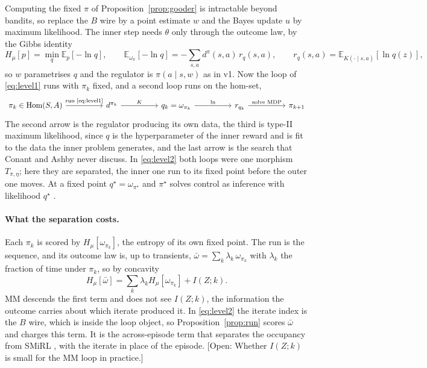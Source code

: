 \documentclass[10pt]{article}
\theoremstyle{plain}
\newcommand{\Hmu}[1]{H_\mu\!\left[#1\right]}
\newcommand{\occ}{d^{\pi}}
\newcommand{\E}{\mathbb E}
\newcommand{\Hom}{\operatorname{Hom}}
\newcommand{\open}[1]{\textcolor{red!70!black}{[Open: #1]}}
\begin{document}
Computing the fixed $\pi$ of Proposition~\ref{prop:gooder} is intractable beyond bandits, so replace the $B$ wire by a point estimate $w$ and the Bayes update $u$ by maximum likelihood.
The inner step needs $\theta$ only through the outcome law, by the Gibbs identity
\begin{equation}
  \Hmu{p} = \min_q \E_{p}[-\ln q],
  \qquad
  \E_{\omega_\pi}[-\ln q] = -\sum_{s,a} \occ(s,a)\, r_q(s,a),
  \qquad
  r_q(s,a) = \E_{K(\cdot \mid s,a)}[\ln q(z)],
  \label{eq:gibbs}
\end{equation}
so $w$ parametrises $q$ and the regulator is $\pi(a \mid s,w)$ as in v1.
Now the loop of \eqref{eq:level1} runs with $\pi_k$ fixed, and a second loop runs on the hom-set,
\begin{equation}
\begin{tikzcd}[column sep=huge]
\pi_k \in \Hom(S,A) \arrow[r, "\text{run \eqref{eq:level1}}"] & d^{\pi_k} \arrow[r, "K"] & q_k = \omega_{\pi_k} \arrow[r, "\ln"] & r_{q_k} \arrow[r, "\text{solve MDP}"] & \pi_{k+1}
\end{tikzcd}
\label{eq:mm}
\end{equation}
The second arrow is the regulator producing its own data, the third is type-II maximum likelihood, since $q$ is the hyperparameter of the inner reward and is fit to the data the inner problem generates, and the last arrow is the search that Conant and Ashby never discuss.
In \eqref{eq:level2} both loops were one morphism $T_{\pi,\eta}$; here they are separated, the inner one run to its fixed point before the outer one moves.
At a fixed point $q^\star = \omega_{\pi^\star}$ and $\pi^\star$ solves control as inference with likelihood $q^\star$ \citep{Toussaint-probabilistic06,Levine-reinforcement18}.

\paragraph{What the separation costs.}
Each $\pi_k$ is scored by $\Hmu{\omega_{\pi_k}}$, the entropy of its own fixed point.
The run is the sequence, and its outcome law is, up to transients, $\bar\omega = \sum_k \lambda_k\, \omega_{\pi_k}$ with $\lambda_k$ the fraction of time under $\pi_k$, so by concavity
\begin{equation}
  \Hmu{\bar\omega} = \sum_k \lambda_k \Hmu{\omega_{\pi_k}} + I(Z;k).
  \label{eq:run-gap}
\end{equation}
MM descends the first term and does not see $I(Z;k)$, the information the outcome carries about which iterate produced it.
In \eqref{eq:level2} the iterate index is the $B$ wire, which is inside the loop object, so Proposition~\ref{prop:run} scores $\bar\omega$ and charges this term.
It is the across-episode term that separates the occupancy from SMiRL \citep{Berseth-smirl21,Mutti-importance22}, with the iterate in place of the episode.
\open{Whether $I(Z;k)$ is small for the MM loop in practice.}
\end{document}
